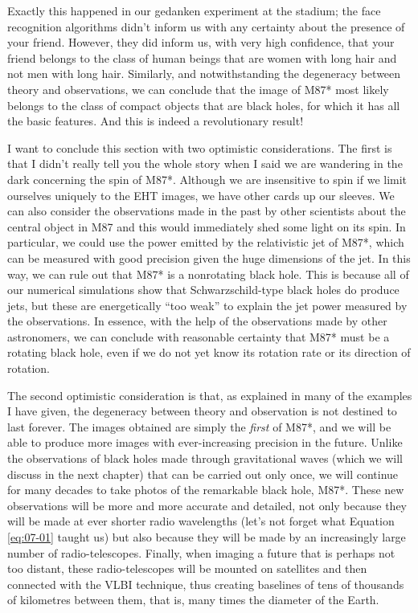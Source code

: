 Exactly this happened in our gedanken experiment at the stadium; the face recognition
algorithms didn't inform us with any certainty about the presence of your friend.
However, they did inform us, with very high confidence, that your friend belongs to the
class of human beings that are women with long hair and not men with long hair.
Similarly, and notwithstanding the degeneracy between theory and
observations, we can conclude that the image of M87* most likely
belongs to the class of compact objects that are black holes, for which it has all the
basic features. And this is indeed a revolutionary result!

I want to conclude this section with two optimistic considerations. The first is that I
didn't really tell you the whole story when I said we are wandering in the dark
concerning the spin of M87*. Although we are insensitive to spin if
we limit ourselves uniquely to the EHT images, we have other cards up our sleeves. We
can also consider the observations made in the past by other scientists about the
central object in M87 and this would immediately shed some light on its spin. In
particular, we could use the power emitted by the relativistic jet of
M87*, which can be measured with good precision given the huge dimensions of the jet. In
this way, we can rule out that M87* is a nonrotating black hole. This is because all of
our numerical simulations show that Schwarzschild-type black holes do produce jets, but
these are energetically ``too weak'' to explain the jet power measured by the
observations. In essence, with the help of the observations made by other astronomers,
we can conclude with reasonable certainty that M87* must be a rotating black hole, even
if we do not yet know its rotation rate or its direction of rotation.

The second optimistic consideration is that, as explained in many of the examples I have
given, the degeneracy between theory and observation is not destined
to last forever. The images obtained are simply the \emph{first} of
M87*, and we will be able to produce more images with ever-increasing
precision in the future. Unlike the observations of black holes made through
gravitational waves (which we will discuss in the next chapter) that
can be carried out only once, we will continue for many decades to take photos of the
remarkable black hole, M87*. These new observations will be more and more accurate and
detailed, not only because they will be made at ever shorter radio wavelengths (let's
not forget what Equation \eqref{eq:07-01} taught us) but also because they will be made by an
increasingly large number of radio-telescopes. Finally, when imaging a future that is
perhaps not too distant, these radio-telescopes will be mounted on satellites and then
connected with the VLBI technique, thus creating baselines of tens of thousands of
kilometres between them, that is, many times the diameter of the Earth.

